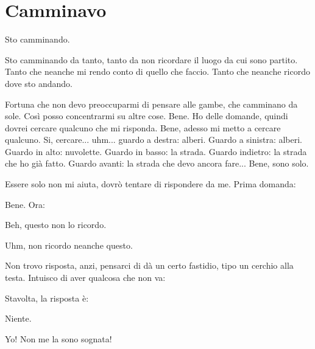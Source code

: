\chapter{Camminavo}

Sto camminando.

Sto camminando da tanto, tanto da non ricordare il luogo da cui sono partito.
Tanto che neanche mi rendo conto di quello che faccio. Tanto che neanche ricordo
dove sto andando.

Fortuna che non devo preoccuparmi di pensare alle gambe, che camminano da sole.
Così posso concentrarmi su altre cose. Bene. Ho delle domande, quindi
dovrei cercare qualcuno che mi risponda. Bene, adesso mi metto a cercare
qualcuno. Si, cercare... uhm... guardo a destra: alberi. Guardo a sinistra:
alberi. Guardo in alto: nuvolette. Guardo in basso: la strada. Guardo indietro:
la strada che ho già fatto. Guardo avanti: la strada che devo ancora
fare... Bene, sono solo.

Essere solo non mi aiuta, dovrò tentare di rispondere da me. Prima domanda:


Bene. Ora:


Beh, questo non lo ricordo.


Uhm, non ricordo neanche questo.


Non trovo risposta, anzi, pensarci di dà un certo fastidio, tipo un cerchio alla
testa. Intuisco di aver qualcosa che non va:


Stavolta, la risposta è:


Niente.


Yo! Non me la sono sognata!


